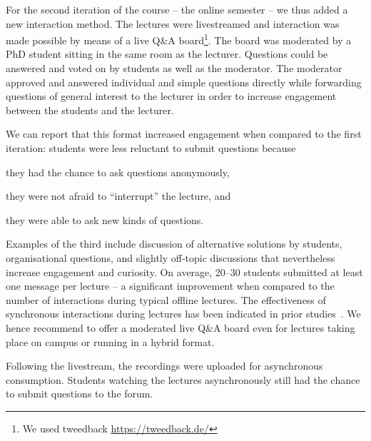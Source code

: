 For the second iteration of the course -- the online semester --
we thus added a new interaction method.
The lectures were livestreamed and
interaction was made possible by means of a live Q\&A board\footnote{We used tweedback \url{https://tweedback.de/}}.
The board was moderated by a PhD student
sitting in the same room as the lecturer.
Questions could be answered and voted on by students as well as the moderator.
The moderator approved and answered individual and simple questions directly while forwarding questions of general interest to the lecturer in order to increase engagement between the students and the lecturer.

We can report that this format increased engagement when compared to the first iteration:
students were less reluctant to submit questions because
\begin{enumerate*}[label=\arabic*)]
  \item they had the chance to ask questions anonymously,
  \item they were not afraid to ``interrupt'' the lecture, and
  \item they were able to ask new kinds of questions.
\end{enumerate*}
Examples of the third include discussion of alternative solutions by students,
organisational questions,
and slightly off-topic discussions that nevertheless increase engagement and curiosity.
On average, 20--30 students
submitted at least one message per lecture -- a significant improvement when compared to the number of interactions during typical offline lectures.
The effectiveness of synchronous interactions during lectures has been indicated in prior studies~\cite{onlineengagement1,onlineengagement3}.
We hence recommend to offer a moderated live Q\&A board even for lectures taking place on campus or running in a hybrid format.

Following the livestream,
the recordings were uploaded for asynchronous consumption.
Students watching the lectures asynchronously still had the chance to submit questions to the forum.

